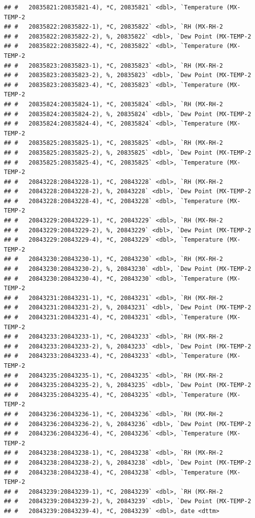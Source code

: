 \documentclass[]{article}
\begin{document}
\begin{verbatim}
## #   20835821:20835821-4), *C, 20835821` <dbl>, `Temperature (MX-TEMP-2
## #   20835822:20835822-1), *C, 20835822` <dbl>, `RH (MX-RH-2
## #   20835822:20835822-2), %, 20835822` <dbl>, `Dew Point (MX-TEMP-2
## #   20835822:20835822-4), *C, 20835822` <dbl>, `Temperature (MX-TEMP-2
## #   20835823:20835823-1), *C, 20835823` <dbl>, `RH (MX-RH-2
## #   20835823:20835823-2), %, 20835823` <dbl>, `Dew Point (MX-TEMP-2
## #   20835823:20835823-4), *C, 20835823` <dbl>, `Temperature (MX-TEMP-2
## #   20835824:20835824-1), *C, 20835824` <dbl>, `RH (MX-RH-2
## #   20835824:20835824-2), %, 20835824` <dbl>, `Dew Point (MX-TEMP-2
## #   20835824:20835824-4), *C, 20835824` <dbl>, `Temperature (MX-TEMP-2
## #   20835825:20835825-1), *C, 20835825` <dbl>, `RH (MX-RH-2
## #   20835825:20835825-2), %, 20835825` <dbl>, `Dew Point (MX-TEMP-2
## #   20835825:20835825-4), *C, 20835825` <dbl>, `Temperature (MX-TEMP-2
## #   20843228:20843228-1), *C, 20843228` <dbl>, `RH (MX-RH-2
## #   20843228:20843228-2), %, 20843228` <dbl>, `Dew Point (MX-TEMP-2
## #   20843228:20843228-4), *C, 20843228` <dbl>, `Temperature (MX-TEMP-2
## #   20843229:20843229-1), *C, 20843229` <dbl>, `RH (MX-RH-2
## #   20843229:20843229-2), %, 20843229` <dbl>, `Dew Point (MX-TEMP-2
## #   20843229:20843229-4), *C, 20843229` <dbl>, `Temperature (MX-TEMP-2
## #   20843230:20843230-1), *C, 20843230` <dbl>, `RH (MX-RH-2
## #   20843230:20843230-2), %, 20843230` <dbl>, `Dew Point (MX-TEMP-2
## #   20843230:20843230-4), *C, 20843230` <dbl>, `Temperature (MX-TEMP-2
## #   20843231:20843231-1), *C, 20843231` <dbl>, `RH (MX-RH-2
## #   20843231:20843231-2), %, 20843231` <dbl>, `Dew Point (MX-TEMP-2
## #   20843231:20843231-4), *C, 20843231` <dbl>, `Temperature (MX-TEMP-2
## #   20843233:20843233-1), *C, 20843233` <dbl>, `RH (MX-RH-2
## #   20843233:20843233-2), %, 20843233` <dbl>, `Dew Point (MX-TEMP-2
## #   20843233:20843233-4), *C, 20843233` <dbl>, `Temperature (MX-TEMP-2
## #   20843235:20843235-1), *C, 20843235` <dbl>, `RH (MX-RH-2
## #   20843235:20843235-2), %, 20843235` <dbl>, `Dew Point (MX-TEMP-2
## #   20843235:20843235-4), *C, 20843235` <dbl>, `Temperature (MX-TEMP-2
## #   20843236:20843236-1), *C, 20843236` <dbl>, `RH (MX-RH-2
## #   20843236:20843236-2), %, 20843236` <dbl>, `Dew Point (MX-TEMP-2
## #   20843236:20843236-4), *C, 20843236` <dbl>, `Temperature (MX-TEMP-2
## #   20843238:20843238-1), *C, 20843238` <dbl>, `RH (MX-RH-2
## #   20843238:20843238-2), %, 20843238` <dbl>, `Dew Point (MX-TEMP-2
## #   20843238:20843238-4), *C, 20843238` <dbl>, `Temperature (MX-TEMP-2
## #   20843239:20843239-1), *C, 20843239` <dbl>, `RH (MX-RH-2
## #   20843239:20843239-2), %, 20843239` <dbl>, `Dew Point (MX-TEMP-2
## #   20843239:20843239-4), *C, 20843239` <dbl>, date <dttm>
\end{verbatim}
\end{document}
